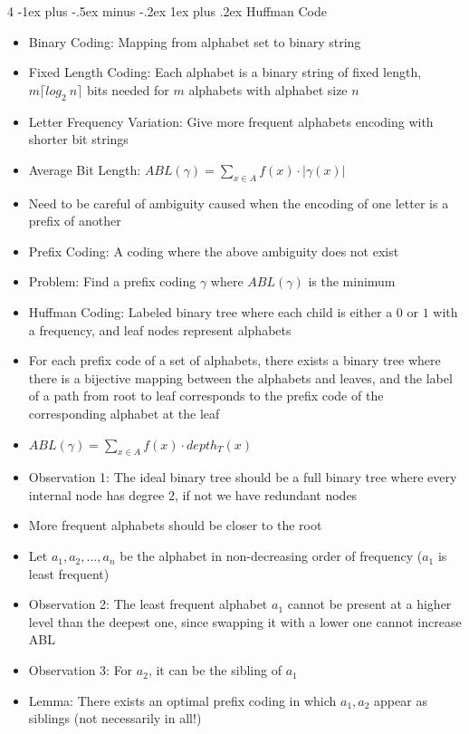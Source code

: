 \documentclass[10pt, landscape]{article}
\makeatletter
\renewcommand{\subsection}{\@startsection{subsection}{3}{0mm}%
                                {-1ex plus -.5ex minus -.2ex}%
                                {1ex plus .2ex}%
                                {\normalfont\small\bfseries}}%
\makeatother
\begin{document}
\begin{multicols*}{4}
\subsection{Huffman Code}
\begin{itemize}
    \item Binary Coding: Mapping from alphabet set to binary string
    \item Fixed Length Coding: Each alphabet is a binary string of fixed length, $m\lceil log_2\ n \rceil$ bits needed for $m$ alphabets with alphabet size $n$
    \item Letter Frequency Variation: Give more frequent alphabets encoding with shorter bit strings
    \item Average Bit Length: $ABL(\gamma)=\sum_{x\in A}f(x)\cdot|\gamma(x)|$
    \item Need to be careful of ambiguity caused when the encoding of one letter is a prefix of another
    \item Prefix Coding: A coding where the above ambiguity does not exist
    \item Problem: Find a prefix coding $\gamma$ where $ABL(\gamma)$ is the minimum
    \item Huffman Coding: Labeled binary tree where each child is either a $0$ or $1$ with a frequency, and leaf nodes represent alphabets
    \item For each prefix code of a set of alphabets, there exists a binary tree where there is a bijective mapping between the alphabets and leaves, and the label of a path from root to leaf corresponds to the prefix code of the corresponding alphabet at the leaf
    \item $ABL(\gamma)=\sum_{x\in A}f(x)\cdot depth_T(x)$
    \item Observation 1: The ideal binary tree should be a full binary tree where every internal node has degree $2$, if not we have redundant nodes
    \item More frequent alphabets should be closer to the root
    \item Let $a_1,a_2,...,a_n$ be the alphabet in non-decreasing order of frequency ($a_1$ is least frequent)
    \item Observation 2: The least frequent alphabet $a_1$ cannot be present at a higher level than the deepest one, since swapping it with a lower one cannot increase ABL
    \item Observation 3: For $a_2$, it can be the sibling of $a_1$
    \item Lemma: There exists an optimal prefix coding in which $a_1,a_2$ appear as siblings (not necessarily in all!)

\end{itemize}
\end{multicols*}
\end{document}
